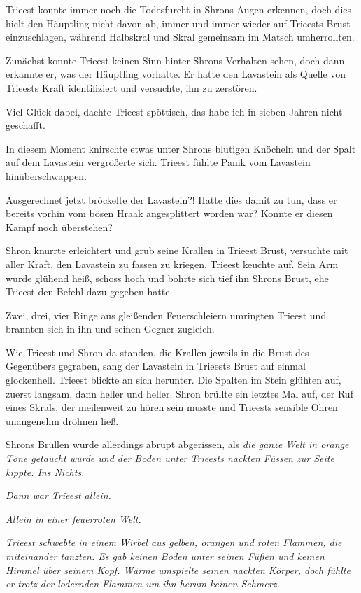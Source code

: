 Trieest konnte immer noch die Todesfurcht in Shrons Augen erkennen, doch dies hielt den Häuptling nicht davon ab, immer und immer wieder auf Trieests Brust einzuschlagen, während Halbskral und Skral gemeinsam im Matsch umherrollten.

Zunächst konnte Trieest keinen Sinn hinter Shrons Verhalten sehen, doch dann erkannte er, was der Häuptling vorhatte. Er hatte den Lavastein als Quelle von Trieests Kraft identifiziert und versuchte, ihn zu zerstören.

Viel Glück dabei, dachte Trieest spöttisch, das habe ich in sieben Jahren nicht geschafft.

In diesem Moment knirschte etwas unter Shrons blutigen Knöcheln und der Spalt auf dem Lavastein vergrößerte sich. Trieest fühlte Panik vom Lavastein hinüberschwappen.

Ausgerechnet jetzt bröckelte der Lavastein?! Hatte dies damit zu tun, dass er bereits vorhin vom bösen Hraak angesplittert worden war? Konnte er diesen Kampf noch überstehen?

Shron knurrte erleichtert und grub seine Krallen in Trieest Brust, versuchte mit aller Kraft, den Lavastein zu fassen zu kriegen. Trieest keuchte auf. Sein Arm wurde glühend heiß, schoss hoch und bohrte sich tief ihn Shrons Brust, ehe Trieest den Befehl dazu gegeben hatte.

Zwei, drei, vier Ringe aus gleißenden Feuerschleiern umringten Trieest und brannten sich in ihn und seinen Gegner zugleich.

Wie Trieest und Shron da standen, die Krallen jeweils in die Brust des Gegenübers gegraben, sang der Lavastein in Trieests Brust auf einmal glockenhell. Trieest blickte an sich herunter. Die Spalten im Stein glühten auf, zuerst langsam, dann heller und heller. Shron brüllte ein letztes Mal auf, der Ruf eines Skrals, der meilenweit zu hören sein musste und Trieests sensible Ohren unangenehm dröhnen ließ.

Shrons Brüllen wurde allerdings abrupt abgerissen, als \textit{die ganze Welt in orange Töne getaucht wurde und der Boden unter Trieests nackten Füssen zur Seite kippte. Ins Nichts.}

\textit{Dann war Trieest allein.}

\textit{Allein in einer feuerroten Welt.}\bigskip







\textit{Trieest schwebte in einem Wirbel aus gelben, orangen und roten Flammen, die miteinander tanzten. Es gab keinen Boden unter seinen Füßen und keinen Himmel über seinem Kopf. Wärme umspielte seinen nackten Körper, doch fühlte er trotz der lodernden Flammen um ihn herum keinen Schmerz.}

